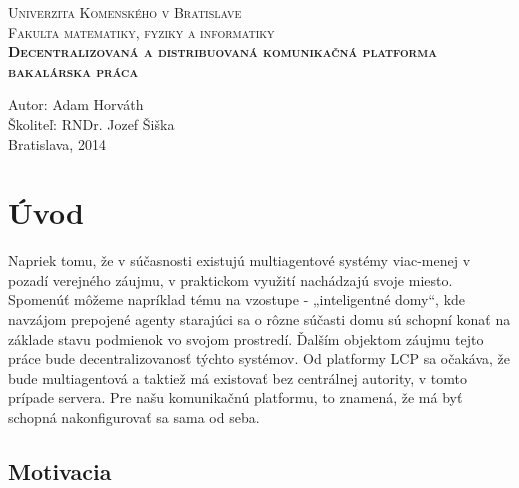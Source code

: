 \documentclass[12pt,a4paper]{report}
\begin{document}
\pagestyle{empty}


\def\skola{Univerzita Komenského v Bratislave} 
\def\fakulta{Fakulta matematiky, fyziky a informatiky} 
\def\nazov{Decentralizovaná a distribuovaná komunikačná platforma} 
\def\autor{Adam Horváth}


\begin{center} 
\scshape\Large 
\skola\\ 
\fakulta\\ 
\vspace*{\fill} 
\bfseries\Large 
\nazov \\[10pt] \mdseries\large 
bakalárska práca\\ 
\end{center} 

\vspace*{\fill} 
\begin{flushleft} 
\large Autor: \autor \\ 
Školiteľ: RNDr. Jozef Šiška \\ 
Bratislava, 2014\\ 
\end{flushleft}



\tableofcontents
\thispagestyle{empty}



\setcounter{page}{0}
\pagestyle{plain}

\chapter{Úvod}
Napriek tomu, že v súčasnosti existujú multiagentové systémy viac-menej v pozadí verejného záujmu, v praktickom využití nachádzajú svoje miesto. Spomenúť môžeme napríklad tému na vzostupe - „inteligentné domy“, kde navzájom prepojené agenty starajúci sa o rôzne súčasti domu sú schopní konať na základe stavu podmienok vo svojom prostredí. 
Ďalším objektom záujmu tejto práce bude decentralizovanosť týchto systémov. Od platformy LCP sa očakáva, že bude multiagentová a taktiež má existovať bez centrálnej autority, v tomto prípade servera. Pre našu komunikačnú platformu, to znamená, že má byť schopná nakonfigurovať sa sama od seba.
\newline

\section{Motivacia}
\end{document}
